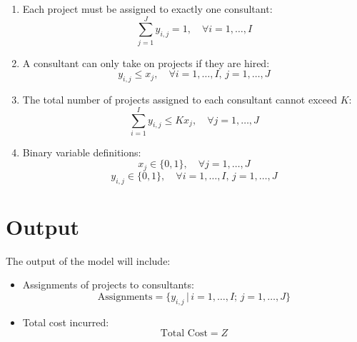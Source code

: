 \documentclass{article}
\begin{document}
\begin{enumerate}
    \item Each project must be assigned to exactly one consultant:
    \[
    \sum_{j=1}^{J} y_{i,j} = 1, \quad \forall i = 1, \ldots, I
    \]

    \item A consultant can only take on projects if they are hired:
    \[
    y_{i,j} \leq x_j, \quad \forall i = 1, \ldots, I, \, j = 1, \ldots, J
    \]

    \item The total number of projects assigned to each consultant cannot exceed $K$:
    \[
    \sum_{i=1}^{I} y_{i,j} \leq K x_j, \quad \forall j = 1, \ldots, J
    \]
    
    \item Binary variable definitions:
    \[
    x_j \in \{0, 1\}, \quad \forall j = 1, \ldots, J
    \]
    \[
    y_{i,j} \in \{0, 1\}, \quad \forall i = 1, \ldots, I, \, j = 1, \ldots, J
    \]
\end{enumerate}

\section*{Output}

The output of the model will include:
\begin{itemize}
    \item Assignments of projects to consultants: 
    \[
    \text{Assignments} = \{ y_{i,j} \, | \, i = 1, \ldots, I; \, j = 1, \ldots, J \}
    \]
    \item Total cost incurred:
    \[
    \text{Total Cost} = Z
    \]
\end{itemize}
\end{document}
